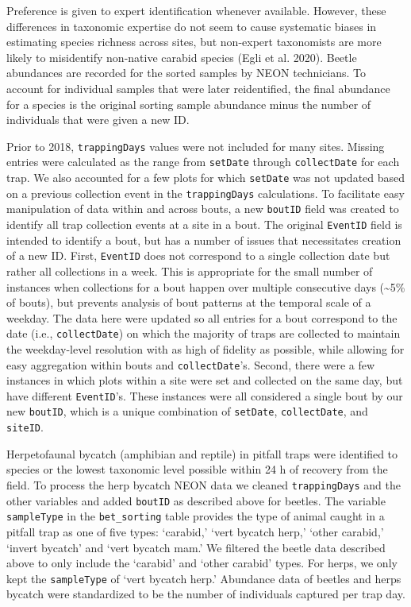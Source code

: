 \documentclass[
  12pt,
]{article}
\begin{document}
Preference is given to expert identification whenever available. However, these differences in taxonomic expertise do not seem to cause systematic biases in estimating species richness across sites, but non-expert taxonomists are more likely to misidentify non-native carabid species (Egli et al. 2020). Beetle abundances are recorded for the sorted samples by NEON technicians. To account for individual samples that were later reidentified, the final abundance for a species is the original sorting sample abundance minus the number of individuals that were given a new ID.

Prior to 2018, \texttt{trappingDays} values were not included for many sites. Missing entries were calculated as the range from \texttt{setDate} through \texttt{collectDate} for each trap. We also accounted for a few plots for which \texttt{setDate} was not updated based on a previous collection event in the \texttt{trappingDays} calculations. To facilitate easy manipulation of data within and across bouts, a new \texttt{boutID} field was created to identify all trap collection events at a site in a bout. The original \texttt{EventID} field is intended to identify a bout, but has a number of issues that necessitates creation of a new ID. First, \texttt{EventID} does not correspond to a single collection date but rather all collections in a week. This is appropriate for the small number of instances when collections for a bout happen over multiple consecutive days (\textasciitilde5\% of bouts), but prevents analysis of bout patterns at the temporal scale of a weekday. The data here were updated so all entries for a bout correspond to the date (i.e., \texttt{collectDate}) on which the majority of traps are collected to maintain the weekday-level resolution with as high of fidelity as possible, while allowing for easy aggregation within bouts and \texttt{collectDate}'s. Second, there were a few instances in which plots within a site were set and collected on the same day, but have different \texttt{EventID}'s. These instances were all considered a single bout by our new \texttt{boutID}, which is a unique combination of \texttt{setDate}, \texttt{collectDate}, and \texttt{siteID}.

Herpetofaunal bycatch (amphibian and reptile) in pitfall traps were identified to species or the lowest taxonomic level possible within 24 h of recovery from the field. To process the herp bycatch NEON data we cleaned \texttt{trappingDays} and the other variables and added \texttt{boutID} as described above for beetles. The variable \texttt{sampleType} in the \texttt{bet\_sorting} table provides the type of animal caught in a pitfall trap as one of five types: `carabid,' `vert bycatch herp,' `other carabid,' `invert bycatch' and `vert bycatch mam.' We filtered the beetle data described above to only include the `carabid' and `other carabid' types. For herps, we only kept the \texttt{sampleType} of `vert bycatch herp.' Abundance data of beetles and herps bycatch were standardized to be the number of individuals captured per trap day.
\end{document}
